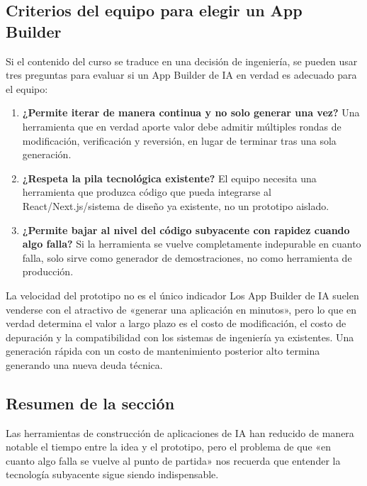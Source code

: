 \subsection{Criterios del equipo para elegir un App Builder}

Si el contenido del curso se traduce en una decisión de ingeniería, se pueden usar tres preguntas para evaluar si un App Builder de IA en verdad es adecuado para el equipo:

\begin{enumerate}
    \item \textbf{¿Permite iterar de manera continua y no solo generar una vez?} Una herramienta que en verdad aporte valor debe admitir múltiples rondas de modificación, verificación y reversión, en lugar de terminar tras una sola generación.
    \item \textbf{¿Respeta la pila tecnológica existente?} El equipo necesita una herramienta que produzca código que pueda integrarse al React/Next.js/sistema de diseño ya existente, no un prototipo aislado.
    \item \textbf{¿Permite bajar al nivel del código subyacente con rapidez cuando algo falla?} Si la herramienta se vuelve completamente indepurable en cuanto falla, solo sirve como generador de demostraciones, no como herramienta de producción.
\end{enumerate}

\begin{warningbox}{La velocidad del prototipo no es el único indicador}
Los App Builder de IA suelen venderse con el atractivo de «generar una aplicación en minutos», pero lo que en verdad determina el valor a largo plazo es el costo de modificación, el costo de depuración y la compatibilidad con los sistemas de ingeniería ya existentes. Una generación rápida con un costo de mantenimiento posterior alto termina generando una nueva deuda técnica.
\end{warningbox}

\subsection{Resumen de la sección}

Las herramientas de construcción de aplicaciones de IA han reducido de manera notable el tiempo entre la idea y el prototipo, pero el problema de que «en cuanto algo falla se vuelve al punto de partida» nos recuerda que entender la tecnología subyacente sigue siendo indispensable.

